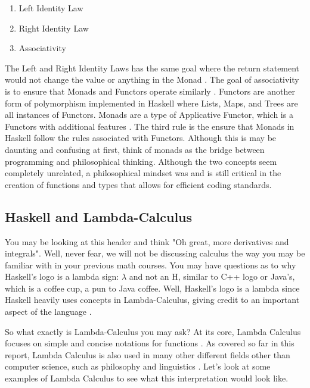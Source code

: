 \documentclass{article}
\begin{document}
\begin{enumerate}
    \item Left Identity Law
    \item Right Identity Law
    \item Associativity
\end{enumerate}

\noindent
The Left and Right Identity Laws has the same goal where the return statement would not change the value or anything in the Monad \cite{TP Monads}. The goal of associativity is to ensure that Monads and Functors operate similarly \cite{TP Monads}. Functors are another form of polymorphism implemented in Haskell where Lists, Maps, and Trees are all instances of Functors. Monads are a type of Applicative Functor, which is a Functors with additional features \cite{TP Functors}. The third rule is the ensure that Monads in Haskell follow the rules associated with Functors. Although this is may be daunting and confusing at first, think of monads as the bridge between programming and philosophical thinking. Although the two concepts seem completely unrelated, a philosophical mindset was and is still critical in the creation of functions and types that allows for efficient coding standards.

\subsection{Haskell and Lambda-Calculus}

You may be looking at this header and think "Oh great, more derivatives and integrals". Well, never fear, we will not be discussing calculus the way you may be familiar with in your previous math courses. You may have questions as to why Haskell's logo is a lambda sign: $\lambda$ and not an H, similar to C++ logo or Java's, which is a coffee cup, a pun to Java coffee. Well, Haskell's logo is a lambda since Haskell heavily uses concepts in Lambda-Calculus, giving credit to an important aspect of the language \cite{Haskell Logo}.

\medskip\noindent
So what exactly is Lambda-Calculus you may ask? At its core, Lambda Calculus focuses on simple and concise notations for functions \cite{Lambda Calculus}. As covered so far in this report, Lambda Calculus is also used in many other different fields other than computer science, such as philosophy and linguistics \cite{Lambda Calculus}. Let's look at some examples of Lambda Calculus to see what this interpretation would look like.
\end{document}
